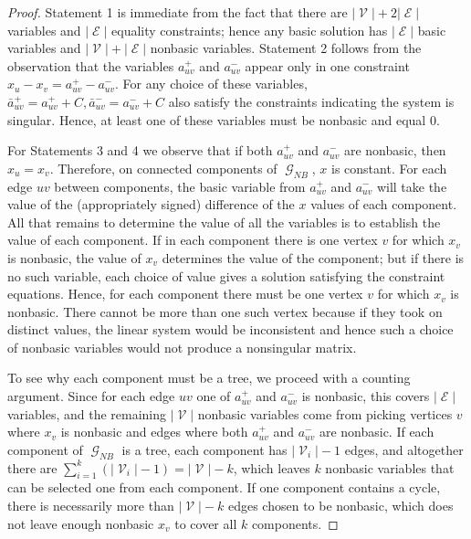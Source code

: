 \documentclass[pdflatex,sn-mathphys-num]{sn-jnl}%
\DeclareMathOperator{\Gcal}{\mathcal{G}}
\DeclareMathOperator{\Ecal}{\mathcal{E}}
\DeclareMathOperator{\Vcal}{\mathcal{V}}
\begin{document}
\begin{proof}
    Statement 1 is immediate from the fact that there are $|\Vcal| + 2|\Ecal|$ variables and $|\Ecal|$ equality constraints; hence any basic solution has $|\Ecal|$ basic variables and $|\Vcal| + |\Ecal|$ nonbasic variables. Statement 2 follows from the observation that the variables $a_{uv}^+$ and $a_{uv}^-$  appear only in one constraint $x_u - x_v = a_{uv}^+ - a_{uv}^-$. For any choice of these variables, $\bar{a}^{+}_{uv} = a_{uv}^+ + C, \bar{a}^-_{uv} = a_{uv}^- + C$ also satisfy the constraints indicating the system is singular. Hence, at least one of these variables must be nonbasic and equal 0.

For Statements 3 and 4 we observe that if both $a_{uv}^+$ and $a_{uv}^-$ are nonbasic, then $x_u = x_v$. Therefore, on connected components  of $\Gcal_{NB}$, $x$ is constant. For each edge $uv$ between components, the basic variable from $a_{uv}^+$ and $a_{uv}^-$ will take the value of the (appropriately signed) difference of the $x$ values of each component. All that remains to determine the value of all the variables is to establish the value of each component. If in each component there is one vertex $v$ for which $x_v$ is nonbasic, the value of $x_v$ determines the value of the component; but if there is no such variable, each choice of value gives a solution satisfying the constraint equations. Hence, for each component there must be one vertex $v$ for which $x_v$ is nonbasic. There cannot be more than one such vertex because if they took on distinct values, the linear system would be inconsistent and hence such a choice of nonbasic variables would not produce a nonsingular matrix.

To see why each component must be a tree, we proceed with a counting argument. Since for each edge $uv$ one of $a_{uv}^+$ and $a_{uv}^-$ is nonbasic, this covers $|\Ecal|$ variables, and the remaining $|\Vcal|$ nonbasic variables come from picking vertices $v$ where $x_v$ is nonbasic and edges where both $a_{uv}^+$ and $a_{uv}^-$ are nonbasic. If each component of $\Gcal_{NB}$ is a tree, each component has $|\Vcal_i| - 1$ edges, and altogether there are $\sum_{i=1}^k (|\Vcal_i| - 1) = |\Vcal| - k$, which leaves $k$ nonbasic variables that can be selected one from each component. If one component contains a cycle, there is necessarily more than $|\Vcal| - k$ edges chosen to be nonbasic, which does not leave enough nonbasic $x_v$ to cover all $k$ components.
\end{proof}
\end{document}

